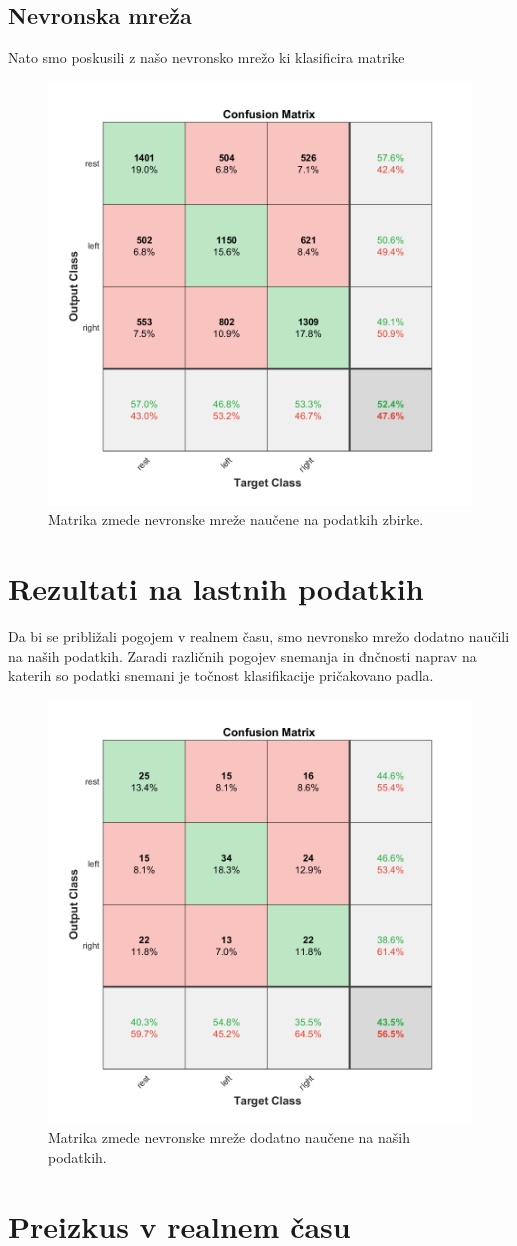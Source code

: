 \subsection{Nevronska mreža}
Nato smo poskusili z našo nevronsko mrežo ki klasificira matrike

\begin{figure}[h!]
\begin{center}
\includegraphics[width=0.5\linewidth]{slike/Confusion_13-20Hz_0s-4s.png}
\end{center}
\caption{Matrika zmede nevronske mreže naučene na podatkih zbirke.}
\end{figure}



\section{Rezultati na lastnih podatkih}
Da bi se približali pogojem v realnem času, smo nevronsko mrežo dodatno naučili na naših podatkih. Zaradi različnih pogojev snemanja in đnčnosti naprav na katerih so podatki snemani je točnost klasifikacije pričakovano padla.
\begin{figure}[h!]
\begin{center}
\includegraphics[width=0.5\linewidth]{slike/Confusion_13-20Hz_0s-4s_retrained.png}
\end{center}
\caption{Matrika zmede nevronske mreže dodatno naučene na naših podatkih.}
\end{figure}
\section{Preizkus v realnem času}




